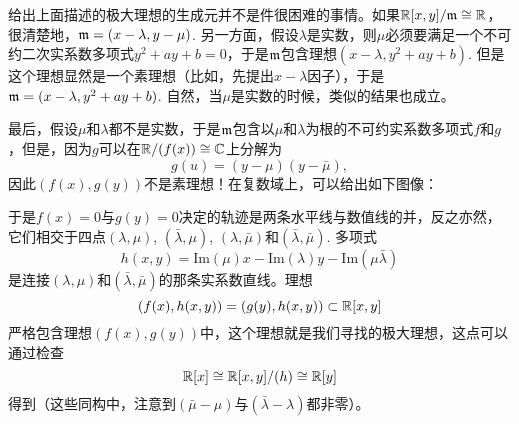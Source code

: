 给出上面描述的极大理想的生成元并不是件很困难的事情。如果$\mathbb{R}[x,y]/\mathfrak{m}\cong \mathbb{R} $，很清楚地，$\mathfrak{m}=(x-\lambda,y-\mu)$. 另一方面，假设$\lambda$是实数，则$\mu$必须要满足一个不可约二次实系数多项式$y^2+ay+b=0$，于是$\mathfrak{m}$包含理想$(x-\lambda,y^2+ay+b)$. 但是这个理想显然是一个素理想（比如，先提出$x-\lambda$因子），于是$\mathfrak{m}=(x-\lambda,y^2+ay+b)$. 自然，当$\mu$是实数的时候，类似的结果也成立。

最后，假设$\mu$和$\lambda$都不是实数，于是$\mathfrak{m}$包含以$\mu$和$\lambda$为根的不可约实系数多项式$f$和$g$，但是，因为$g$可以在$\mathbb{R}/(f(x))\cong \mathbb{C}$上分解为
\[
	g(u)=(y-\mu)(y-\bar\mu),
\]
因此$(f(x),g(y))$不是素理想！在复数域上，可以给出如下图像：


于是$f(x)=0$与$g(y)=0$决定的轨迹是两条水平线与数值线的并，反之亦然，它们相交于四点$(\lambda,\mu)$, $(\bar\lambda,\mu)$, $(\lambda,\bar\mu)$和$(\bar\lambda,\bar\mu)$. 多项式
\[
	h(x,y)=\mathrm{Im}(\mu) x - \mathrm{Im}(\lambda)  y -\mathrm{Im}(\mu\bar\lambda)
\]
是连接$(\lambda,\mu)$和$(\bar\lambda,\bar\mu)$的那条实系数直线。理想
\[
	(f(x),h(x,y))=(g(y),h(x,y))\subset \mathbb{R}[x,y]
\]
严格包含理想$(f(x),g(y))$中，这个理想就是我们寻找的极大理想，这点可以通过检查
\[
	\mathbb{R}[x]\cong \mathbb{R}[x,y]/(h)\cong \mathbb{R}[y]
\]
得到（这些同构中，注意到$(\bar\mu-\mu)$与$(\bar\lambda-\lambda)$都非零）。